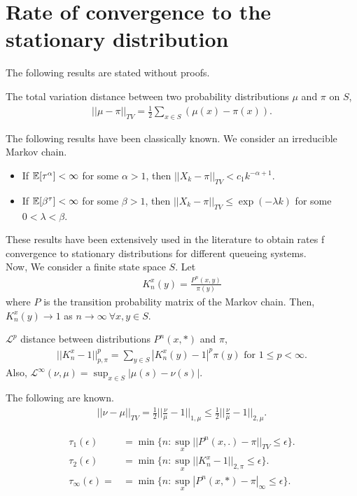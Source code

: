 \documentclass[all-lectures.tex]{subfiles}
\begin{document}
\section{Rate of convergence to the stationary distribution}
The following results are stated without proofs.
\begin{defn}
The total variation distance between two probability distributions $\mu$ and $\pi$ on $S$, 
\begin{align*}
||\mu - \pi||_{TV} = \frac{1}{2} \sum_{x\in S} (\mu(x) - \pi(x)).
\end{align*}
\end{defn}
The following results have been classically known.  We consider an irreducible Markov chain.
\begin{itemize}
\item If $\mathbb{E}[\tau^\alpha] < \infty$ for some $\alpha > 1$, then $|| X_k - \pi ||_{TV} < c_1 k^{-\alpha +1}$.
\item If $\mathbb{E}[\beta^{\tau}] < \infty$ for some $\beta > 1$, then $|| X_k - \pi||_{TV} \leq \exp(-\lambda k)$ for some $0 < \lambda < \beta$.
\end{itemize}
These results have been extensively used in the literature to obtain rates f convergence to stationary distributions for different queueing systems. \\
\indent Now, We consider a finite state space $S$. Let 
\begin{align*}
K_n^{x}(y) = \frac{P^n(x,y)}{\pi(y)}
\end{align*}
where $P$ is the transition probability matrix of the Markov chain. Then, $K_n^{x}(y) \rightarrow 1$ as $n \rightarrow \infty \ \forall x,y \in S$. 
\begin{defn}
$\mathcal{L}^p$ distance between distributions $P^n(x,*)$ and $\pi$, 
\begin{align*}
||K^x_n - 1||^p_{p,\pi} = \sum_{y\in S} |K^x_n(y)-1|^p \pi(y) \text{ for } 1 \leq p < \infty.
\end{align*}
Also, $\mathcal{L}^{\infty}(\nu,\mu) = \sup_{x\in S} |\mu(s) - \nu(s)|$.
\end{defn}

The following are known.
\begin{align}\label{eq:tau_bounds}
||\nu -\mu||_{TV} = \frac{1}{2} ||\frac{\nu}{\mu} -1||_{1,\mu} \leq \frac{1}{2} ||\frac{\nu}{\mu} -1 ||_{2,\mu}.
\end{align}
\begin{defn}
\begin{align*}
\tau_1(\epsilon) &= \min\{n: \sup_x ||P^n(x,.)-\pi||_{TV} \leq \epsilon\}. \\
\tau_2(\epsilon) &= \min\{n: \sup_x ||K_n^x - 1||_{2,\pi} \leq \epsilon\}. \\
\tau_\infty(\epsilon) = &= \min\{n: \sup _x |P^n(x,*) - \pi|_\infty \leq \epsilon\}.
\end{align*}
\end{defn}
\end{document}
